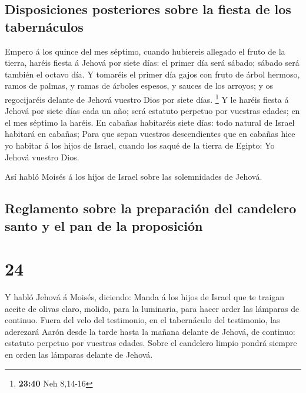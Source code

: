 \hypertarget{disposiciones-posteriores-sobre-la-fiesta-de-los-tabernuxe1culos}{%
\subsection{Disposiciones posteriores sobre la fiesta de los
tabernáculos}\label{disposiciones-posteriores-sobre-la-fiesta-de-los-tabernuxe1culos}}

 Empero á los quince del mes séptimo, cuando hubiereis
allegado el fruto de la tierra, haréis fiesta á Jehová por siete días:
el primer día será sábado; sábado será también el octavo día.
 Y tomaréis el primer día gajos con fruto de árbol
hermoso, ramos de palmas, y ramas de árboles espesos, y sauces de los
arroyos; y os regocijaréis delante de Jehová vuestro Dios por siete
días. \footnote{\textbf{23:40} Neh 8,14-16}  Y le haréis
fiesta á Jehová por siete días cada un año; será estatuto perpetuo por
vuestras edades; en el mes séptimo la haréis.  En cabañas
habitaréis siete días: todo natural de Israel habitará en cabañas;
 Para que sepan vuestros descendientes que en cabañas
hice yo habitar á los hijos de Israel, cuando los saqué de la tierra de
Egipto: Yo Jehová vuestro Dios.

 Así habló Moisés á los hijos de Israel sobre las
solemnidades de Jehová.

\hypertarget{reglamento-sobre-la-preparaciuxf3n-del-candelero-santo-y-el-pan-de-la-proposiciuxf3n}{%
\subsection{Reglamento sobre la preparación del candelero santo y el pan
de la
proposición}\label{reglamento-sobre-la-preparaciuxf3n-del-candelero-santo-y-el-pan-de-la-proposiciuxf3n}}

\hypertarget{section-23}{%
\section{24}\label{section-23}}

 Y habló Jehová á Moisés, diciendo:  Manda á
los hijos de Israel que te traigan aceite de olivas claro, molido, para
la luminaria, para hacer arder las lámparas de continuo. 
Fuera del velo del testimonio, en el tabernáculo del testimonio, las
aderezará Aarón desde la tarde hasta la mañana delante de Jehová, de
continuo: estatuto perpetuo por vuestras edades.  Sobre el
candelero limpio pondrá siempre en orden las lámparas delante de Jehová.

